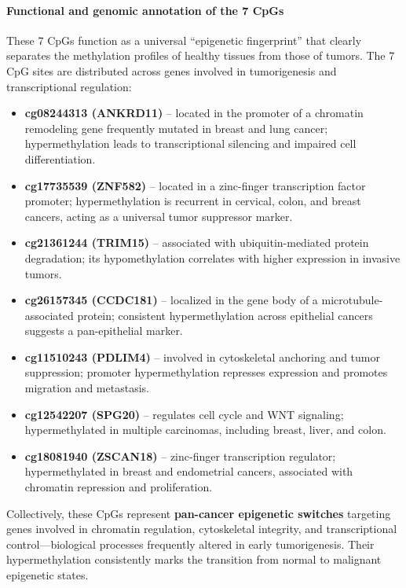 \documentclass[10pt]{extarticle}
\begin{document}
\paragraph{Functional and genomic annotation of the 7 CpGs} These 7 CpGs function as a universal “epigenetic fingerprint” that clearly separates the methylation profiles of healthy tissues from those of tumors.
The 7 CpG sites are distributed across genes involved in tumorigenesis and transcriptional regulation:
\begin{itemize}[label=-]
\item \textbf{cg08244313 (ANKRD11)} – located in the promoter of a chromatin remodeling gene frequently mutated in breast and lung cancer; hypermethylation leads to transcriptional silencing and impaired cell differentiation.
\item \textbf{cg17735539 (ZNF582)} – located in a zinc-finger transcription factor promoter; hypermethylation is recurrent in cervical, colon, and breast cancers, acting as a universal tumor suppressor marker.
\item \textbf{cg21361244 (TRIM15)} – associated with ubiquitin-mediated protein degradation; its hypomethylation correlates with higher expression in invasive tumors.
\item \textbf{cg26157345 (CCDC181)} – localized in the gene body of a microtubule-associated protein; consistent hypermethylation across epithelial cancers suggests a pan-epithelial marker.
\item \textbf{cg11510243 (PDLIM4)} – involved in cytoskeletal anchoring and tumor suppression; promoter hypermethylation represses expression and promotes migration and metastasis.
\item \textbf{cg12542207 (SPG20)} – regulates cell cycle and WNT signaling; hypermethylated in multiple carcinomas, including breast, liver, and colon.
\item \textbf{cg18081940 (ZSCAN18)} – zinc-finger transcription regulator; hypermethylated in breast and endometrial cancers, associated with chromatin repression and proliferation.
\end{itemize}
Collectively, these CpGs represent \textbf{pan-cancer epigenetic switches} targeting genes involved in chromatin regulation, cytoskeletal integrity, and transcriptional control—biological processes frequently altered in early tumorigenesis. Their hypermethylation consistently marks the transition from normal to malignant epigenetic states.
\end{document}
